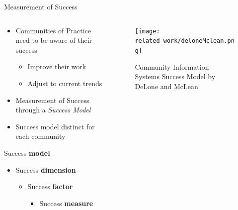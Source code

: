 \begin{frame}{Measurement of Success}
  \begin{columns}
    \begin{column}[]{0.3\textwidth}
      \begin{itemize}
        \item Communities of Practice need to be aware of their success
              \begin{itemize}
                \item Improve their work
                \item Adjust to current trends
              \end{itemize}
        \item Measurement of Success through a \emph{Success Model}
        \item Success model distinct for each community
      \end{itemize}

      Success \textbf{model} 
      \begin{itemize}
        \item Success \textbf{dimension}
        \begin{itemize}
          \item Success \textbf{factor}
          \begin{itemize}
            \item Success \textbf{measure}
          \end{itemize}
        \end{itemize}
      \end{itemize}

    \end{column}
    \begin{column}[]{0.7\textwidth}
      \begin{figure}
        \centering
        \texttt{[image: related\_work/deloneMclean.png]}
        \caption{Community Information Systems Success Model by DeLone and McLean \cite{DeMc92}}
      \end{figure}
    \end{column}
  \end{columns}
\end{frame}

